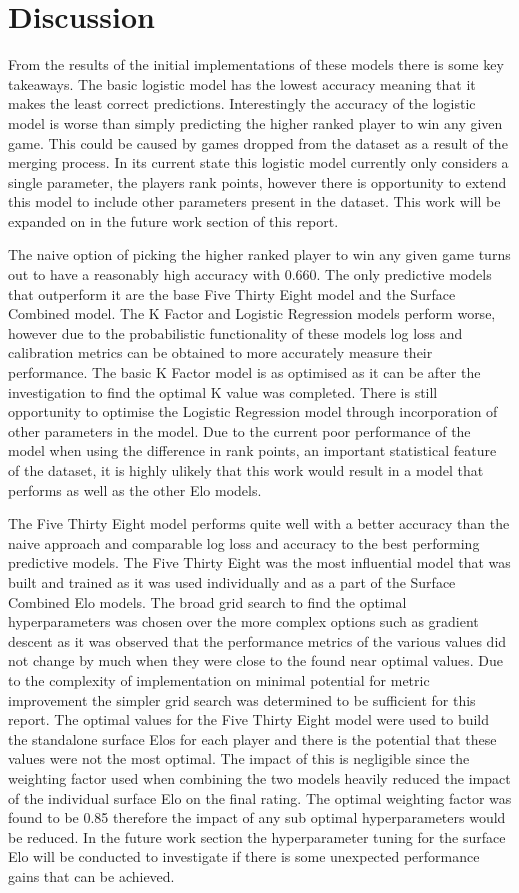 \documentclass[12pt,a4paper]{article}
\begin{document}
\clearpage
\section{Discussion}
From the results of the initial implementations of these models there is some key
takeaways. The basic logistic model has the lowest accuracy meaning that it
makes the least correct predictions. Interestingly the accuracy of the logistic model is
worse than simply predicting the higher ranked player to win any given game. This could be
caused by games dropped from the dataset as a result of the merging process.
In its current state this logistic model currently only
considers a single parameter, the players rank points, however there is opportunity to
extend this model to include other parameters present in the dataset. This work will be expanded
on in the future work section of this report.

The naive option of picking the higher ranked player to win any given game turns out to have
a reasonably high accuracy with 0.660. The only predictive models that outperform it are the base
Five Thirty Eight model and the Surface Combined model. The K Factor and Logistic Regression models
perform worse, however due to the probabilistic functionality of these models log loss and calibration
metrics can be obtained to more accurately measure their performance. The basic K Factor model
is as optimised as it can be after the investigation to find the optimal K value was completed.
There is still opportunity to optimise the Logistic Regression model through incorporation of
other parameters in the model. Due to the current poor performance of the model when using
the difference in rank points, an important statistical feature of the dataset, it is highly ulikely
that this work would result in a model that performs as well as the other Elo models.

The Five Thirty Eight model performs quite well with a better accuracy than the naive approach and
comparable log loss and accuracy to the best performing predictive models. The Five Thirty Eight
was the most influential model that was built and trained as it was used individually and as a
part of the Surface Combined Elo models. The broad grid search to find the optimal hyperparameters
was chosen over the more complex options such as gradient descent as it was observed that the
performance metrics of the various values did not change by much when they were close to the found
near optimal values. Due to the complexity of implementation on minimal potential for metric
improvement the simpler grid search was determined to be sufficient for this report. The optimal
values for the Five Thirty Eight model were used to build the standalone surface Elos for each
player and there is the potential that these values were not the most optimal. The impact of this
is negligible since the weighting factor used when combining the two models heavily reduced the impact
of the individual surface Elo on the final rating. The optimal weighting factor was found to be 0.85
therefore the impact of any sub optimal hyperparameters would be reduced. In the future work
section the hyperparameter tuning for the surface Elo will be conducted to investigate if there is
some unexpected performance gains that can be achieved.
\end{document}
